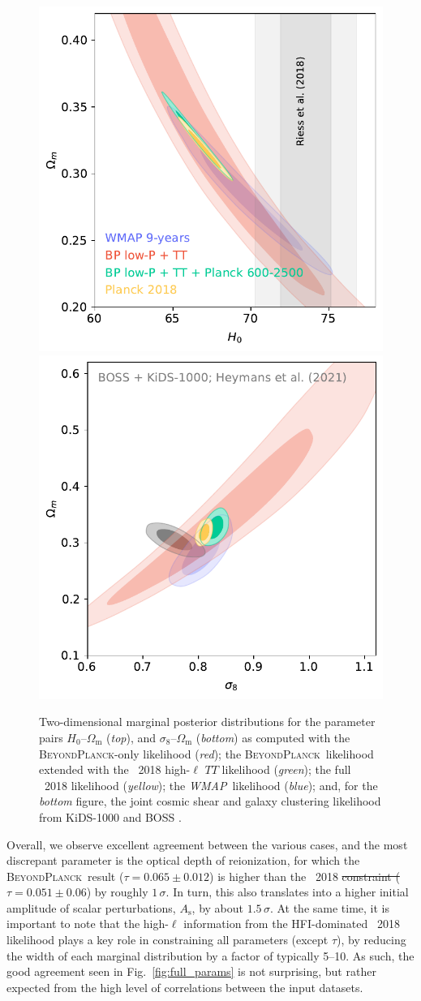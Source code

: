 \documentclass[onecolumn]{aa}
\def\WMAP{\textit{WMAP}}
\newcommand{\BP}{\textsc{BeyondPlanck}}
\providecommand{\DIFaddtex}[1]{{\protect\color{blue}\uwave{#1}}} %
\providecommand{\DIFdeltex}[1]{{\protect\color{red}\sout{#1}}}                      %
\providecommand{\DIFaddbegin}{} %
\providecommand{\DIFaddend}{} %
\providecommand{\DIFdelbegin}{} %
\providecommand{\DIFdelend}{} %
\providecommand{\DIFadd}[1]{\texorpdfstring{\DIFaddtex{#1}}{#1}} %
\providecommand{\DIFdel}[1]{\texorpdfstring{\DIFdeltex{#1}}{}} %
\newcommand{\DIFscaledelfig}{0.5}
\newlength{\DIFdelgraphicswidth} %
\newlength{\DIFdelgraphicsheight} %
\newcommand{\DIFaddincludegraphics}[2][]{{\color{blue}\fbox{\DIFOincludegraphics[#1]{#2}}}} %
\newcommand{\DIFdelincludegraphics}[2][]{%
\sbox{\DIFdelgraphicsbox}{\DIFOincludegraphics[#1]{#2}}%
\settoboxwidth{\DIFdelgraphicswidth}{\DIFdelgraphicsbox} %
\settoboxtotalheight{\DIFdelgraphicsheight}{\DIFdelgraphicsbox} %
\scalebox{\DIFscaledelfig}{%
\parbox[b]{\DIFdelgraphicswidth}{\usebox{\DIFdelgraphicsbox}\\[-\baselineskip] \rule{\DIFdelgraphicswidth}{0em}}\llap{\resizebox{\DIFdelgraphicswidth}{\DIFdelgraphicsheight}{%
\setlength{\unitlength}{\DIFdelgraphicswidth}%
\begin{picture}(1,1)%
\thicklines\linethickness{2pt} %
{\color[rgb]{1,0,0}\put(0,0){\framebox(1,1){}}}%
{\color[rgb]{1,0,0}\put(0,0){\line( 1,1){1}}}%
{\color[rgb]{1,0,0}\put(0,1){\line(1,-1){1}}}%
\end{picture}%
}\hspace*{3pt}}} %
} %
\DeclareRobustCommand{\DIFaddbegin}{\DIFOaddbegin \let\includegraphics\DIFaddincludegraphics} %
\DeclareRobustCommand{\DIFaddend}{\DIFOaddend \let\includegraphics\DIFOincludegraphics} %
\DeclareRobustCommand{\DIFdelbegin}{\DIFOdelbegin \let\includegraphics\DIFdelincludegraphics} %
\DeclareRobustCommand{\DIFdelend}{\DIFOaddend \let\includegraphics\DIFOincludegraphics} %
\begin{document}
\DIFaddend \begin{figure}[ht]
	\center
	\includegraphics[width=0.5\linewidth]{figs/BP10_ext_H0_OmM.pdf} \\
	\includegraphics[width=0.5\linewidth]{figs/BP10_ext_s8_OmM.pdf}
	\caption{Two-dimensional marginal posterior distributions for the parameter pairs 
	$H_0$--$\Omega_{\mathrm m}$ (\emph{top}), and $\sigma_8$--$\Omega_{\mathrm m}$ (\emph{bottom}) 
	as computed with the \BP-only likelihood (\emph{red}); the
        \BP\ likelihood extended with the \Planck\ 2018 high-$\ell$
        $TT$ likelihood (\emph{green}); the full \Planck\ 2018 likelihood 
	(\emph{yellow}); the \WMAP\ likelihood (\emph{blue}); and, for the 
	\emph{bottom} figure, the joint cosmic shear and galaxy clustering
	likelihood from KiDS-1000 and BOSS \citep[][\emph{gray}]{KiDS2021}.}
	\label{fig:s8_omb}
\end{figure}

Overall, we observe excellent agreement between the various cases, and
the most discrepant parameter is the optical depth of reionization,
for which the \BP\ result ($\tau=0.065\pm0.012$) is higher than the
\Planck\ 2018 \DIFdelbegin \DIFdel{constraint ($\tau=0.051\pm0.06$}\DIFdelend \DIFaddbegin \DIFadd{(TT + lowE) constraint ($\tau=0.052\pm0.008$}\DIFaddend ) by roughly
$1\,\sigma$. In turn, this also translates into a higher initial
amplitude of scalar perturbations, $A_{\mathrm{s}}$, by about
$1.5\,\sigma$. At the same time, it is important to note that the
high-$\ell$ information from the HFI-dominated \Planck\ 2018
likelihood plays a key role in constraining all parameters (except
$\tau$), by reducing the width of each marginal distribution by a
factor of typically 5--10. As such, the good agreement seen in
Fig.~\ref{fig:full_params} is not surprising, but rather expected from
the high level of correlations between the input datasets.
\end{document}
